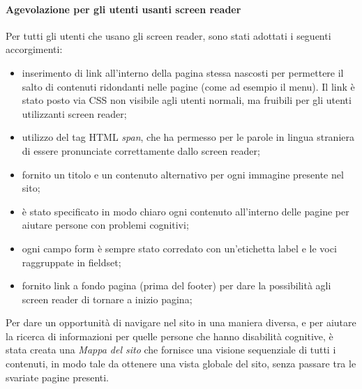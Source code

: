 \paragraph*{Agevolazione per gli utenti usanti screen reader}Per tutti gli utenti che usano gli screen reader, sono stati adottati i seguenti accorgimenti:
\begin{itemize}

    \item inserimento di link all'interno della pagina stessa nascosti per permettere il salto di contenuti ridondanti nelle pagine (come ad esempio il menu). Il link è stato posto via CSS non visibile agli utenti normali, ma fruibili per gli utenti utilizzanti screen reader;
    \item utilizzo del tag HTML \textit{span}, che ha permesso per le parole in lingua straniera di essere pronunciate correttamente dallo screen reader;
    \item fornito un titolo e un contenuto alternativo per ogni immagine presente nel sito;

    \item è stato specificato in modo chiaro ogni contenuto all'interno delle pagine per aiutare persone con problemi cognitivi;

    \item ogni campo form è sempre stato corredato con un'etichetta label e le voci raggruppate in fieldset;

    \item fornito link a fondo pagina (prima del footer) per dare la possibilità agli screen reader di tornare a inizio pagina;

\end{itemize}

Per dare un opportunit\`a di navigare nel sito in una maniera diversa, e per aiutare la ricerca di informazioni per quelle persone che hanno disabilit\`a cognitive, \`e stata creata una \textit{Mappa del sito} che fornisce una visione sequenziale di tutti i contenuti, in modo tale da ottenere una vista globale del sito, senza passare tra le svariate pagine presenti.

